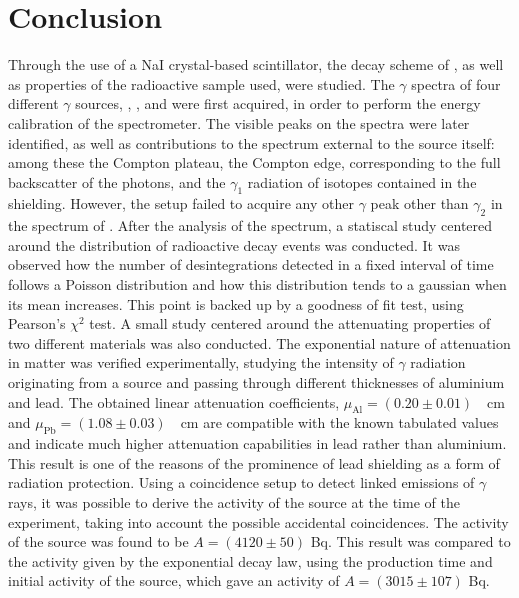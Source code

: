 \section{Conclusion}
Through the use of a NaI crystal-based scintillator, the decay scheme of \cobalt, as well as properties of the radioactive sample used, were studied.
The $\gamma$ spectra of four different $\gamma$ sources, \cesium, \cobalt, \lead and \hafnium were first acquired, in order to perform the energy calibration of the spectrometer.
The visible peaks on the spectra were later identified, as well as contributions to the spectrum external to the source itself:
among these the Compton plateau, the Compton edge, corresponding to the full backscatter of the photons, and the $\gamma_1$ radiation of \lead isotopes contained in the shielding.
However, the setup failed to acquire any other $\gamma$ peak other than $\gamma_2$ in the spectrum of \hafnium.
After the analysis of the spectrum, a statiscal study centered around the distribution of radioactive decay events was conducted.
It was observed how the number of desintegrations detected in a fixed interval of time follows a Poisson distribution and how this distribution tends to a gaussian when its mean increases.
This point is backed up by a goodness of fit test, using Pearson's \(\chi^2\) test.
A small study centered around the attenuating properties of two different materials was also conducted.
The exponential nature of attenuation in matter was verified experimentally, studying the intensity of $\gamma$ radiation originating from a \cesium source and passing through different thicknesses of aluminium and lead.
The obtained linear attenuation coefficients, \mbox{$\mu_{\mathrm{Al}} = (0.20 \pm 0.01)$ \unit{\per\cm}} and \mbox{$\mu_{\mathrm{Pb}} = (1.08 \pm 0.03)$ \unit{\per\cm}} are compatible with the known tabulated values and indicate much higher attenuation capabilities in lead rather than aluminium.
This result is one of the reasons of the prominence of lead shielding as a form of radiation protection.
Using a coincidence setup to detect linked emissions of \(\gamma\) rays, it was possible to derive the activity of the \cobalt source at the time of the experiment, taking into account the possible accidental coincidences.
The activity of the source was found to be $A = (4120 \pm 50)$ Bq.
This result was compared to the activity given by the exponential decay law, using the production time and initial activity of the source, which gave an activity of \(A = (3015 \pm 107)\) Bq.
